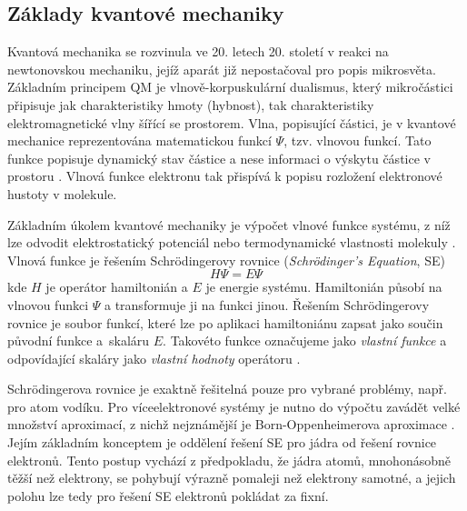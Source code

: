 \subsection{Základy kvantové mechaniky}
Kvantová mechanika se rozvinula ve 20. letech 20. století v reakci na newtonovskou mechaniku, jejíž aparát již nepostačoval pro popis mikrosvěta.  Základním principem QM je vlnově-korpuskulární dualismus, který mikročástici připisuje jak charakteristiky hmoty (hybnost), tak charakteristiky elektromagnetické vlny šířící se prostorem.
Vlna, popisující částici, je v kvantové mechanice reprezentována matematickou funkcí $\Psi$, tzv. vlnovou funkcí. Tato funkce popisuje dynamický stav částice a nese informaci o výskytu částice v prostoru \cite{Cely}. Vlnová funkce elektronu tak přispívá k popisu rozložení elektronové hustoty v molekule. 

Základním úkolem kvantové mechaniky je výpočet vlnové funkce systému, z níž lze odvodit elektrostatický potenciál \cite{elstat_pot} nebo termodynamické vlastnosti molekuly \cite{td}. Vlnová funkce je řešením Schrödingerovy rovnice (\textit{Schrödinger's Equation}, SE)
\begin{equation}
    H\Psi = E\Psi
\end{equation}
kde $H$ je operátor hamiltonián a $E$ je energie systému. Hamiltonián působí na vlnovou funkci $\Psi$ a transformuje ji na funkci jinou. Řešením Schrödingerovy rovnice je soubor funkcí, které lze po aplikaci hamiltoniánu zapsat jako součin původní funkce a~skaláru $E$. Takovéto funkce označujeme jako \textit{vlastní funkce} a odpovídající skaláry jako \textit{vlastní hodnoty} operátoru \cite{Volatron}. 
 
 Schrödingerova rovnice je exaktně řešitelná pouze pro vybrané problémy, např. pro atom vodíku. Pro víceelektronové systémy je nutno do výpočtu zavádět velké množství aproximací, z nichž nejznámější je Born-Oppenheimerova aproximace \cite{BO_approx_Pilar}.
 Jejím základním konceptem je oddělení řešení SE pro jádra od řešení rovnice elektronů. Tento postup vychází z předpokladu, že jádra atomů, mnohonásobně těžší než elektrony, se pohybují výrazně pomaleji než elektrony samotné, a jejich polohu lze tedy pro řešení SE elektronů pokládat za fixní. %
 
